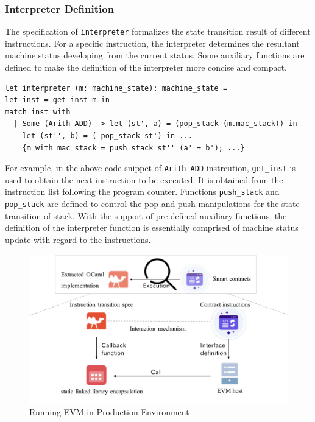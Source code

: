 \documentclass[runningheads]{llncs}
\begin{document}
\subsubsection{Interpreter Definition}\label{sec:interpreter}
The specification of \texttt{interpreter} formalizes the state transition result of different instructions. 
For a specific instruction, the interpreter determines the resultant machine status developing from the current status. 
Some auxiliary functions are defined to make the definition of the interpreter more concise and compact. 
\begin{verbatim}
let interpreter (m: machine_state): machine_state =
let inst = get_inst m in
match inst with 
  | Some (Arith ADD) -> let (st', a) = (pop_stack (m.mac_stack)) in 
    let (st'', b) = ( pop_stack st') in ...
    {m with mac_stack = push_stack st'' (a' + b'); ...}
\end{verbatim}

For example, in the above code snippet of \texttt{Arith ADD} instrcution, 
\texttt{get\_inst} is used to obtain the next instruction to be executed. 
It is obtained from the instruction list following the program counter. 
Functions \texttt{push\_stack} and \texttt{pop\_stack} are defined to control the pop and push manipulations
for the state transition of stack. 
With the support of pre-defined auxiliary functions, 
the definition of the interpreter function is essentially comprised of machine status update with regard to the instructions. 

\begin{figure}[t]
  \centering
  \includegraphics[scale=0.4]{runninginPE.pdf}
  \caption{Running EVM in Production Environment}
   \label{fig2}
\end{figure}
\end{document}
